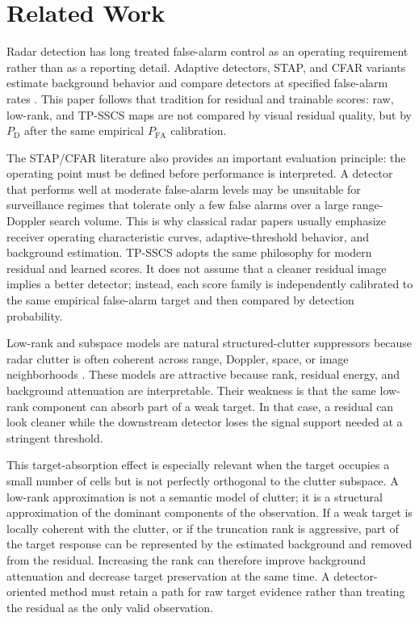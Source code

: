 \documentclass[journal]{IEEEtran}
\begin{document}
\section{Related Work}

Radar detection has long treated false-alarm control as an operating requirement rather than as a reporting detail. Adaptive detectors, STAP, and CFAR variants estimate background behavior and compare detectors at specified false-alarm rates \cite{reed1974adaptive,melvin2004stap,melvin2014stap,rohling1983cfar,kelly1986adaptive,gandhi1988cfar}. This paper follows that tradition for residual and trainable scores: raw, low-rank, and TP-SSCS maps are not compared by visual residual quality, but by $P_{\mathrm{D}}$ after the same empirical $P_{\mathrm{FA}}$ calibration.

The STAP/CFAR literature also provides an important evaluation principle: the operating point must be defined before performance is interpreted. A detector that performs well at moderate false-alarm levels may be unsuitable for surveillance regimes that tolerate only a few false alarms over a large range-Doppler search volume. This is why classical radar papers usually emphasize receiver operating characteristic curves, adaptive-threshold behavior, and background estimation. TP-SSCS adopts the same philosophy for modern residual and learned scores. It does not assume that a cleaner residual image implies a better detector; instead, each score family is independently calibrated to the same empirical false-alarm target and then compared by detection probability.

Low-rank and subspace models are natural structured-clutter suppressors because radar clutter is often coherent across range, Doppler, space, or image neighborhoods \cite{candes2011rpca,vaswani2018robustsubspace}. These models are attractive because rank, residual energy, and background attenuation are interpretable. Their weakness is that the same low-rank component can absorb part of a weak target. In that case, a residual can look cleaner while the downstream detector loses the signal support needed at a stringent threshold.

This target-absorption effect is especially relevant when the target occupies a small number of cells but is not perfectly orthogonal to the clutter subspace. A low-rank approximation is not a semantic model of clutter; it is a structural approximation of the dominant components of the observation. If a weak target is locally coherent with the clutter, or if the truncation rank is aggressive, part of the target response can be represented by the estimated background and removed from the residual. Increasing the rank can therefore improve background attenuation and decrease target preservation at the same time. A detector-oriented method must retain a path for raw target evidence rather than treating the residual as the only valid observation.
\end{document}
